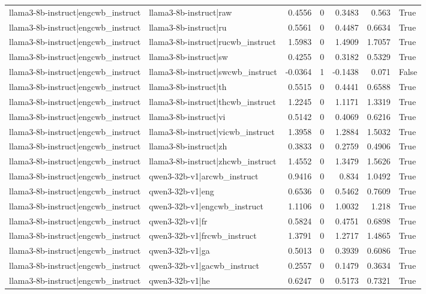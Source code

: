\begin{table}
\begin{tabular}{l l r r r r l}
llama3-8b-instruct|engcwb_instruct & llama3-8b-instruct|raw & 0.4556 & 0 & 0.3483 & 0.563 & True \\
llama3-8b-instruct|engcwb_instruct & llama3-8b-instruct|ru & 0.5561 & 0 & 0.4487 & 0.6634 & True \\
llama3-8b-instruct|engcwb_instruct & llama3-8b-instruct|rucwb_instruct & 1.5983 & 0 & 1.4909 & 1.7057 & True \\
llama3-8b-instruct|engcwb_instruct & llama3-8b-instruct|sw & 0.4255 & 0 & 0.3182 & 0.5329 & True \\
llama3-8b-instruct|engcwb_instruct & llama3-8b-instruct|swcwb_instruct & -0.0364 & 1 & -0.1438 & 0.071 & False \\
llama3-8b-instruct|engcwb_instruct & llama3-8b-instruct|th & 0.5515 & 0 & 0.4441 & 0.6588 & True \\
llama3-8b-instruct|engcwb_instruct & llama3-8b-instruct|thcwb_instruct & 1.2245 & 0 & 1.1171 & 1.3319 & True \\
llama3-8b-instruct|engcwb_instruct & llama3-8b-instruct|vi & 0.5142 & 0 & 0.4069 & 0.6216 & True \\
llama3-8b-instruct|engcwb_instruct & llama3-8b-instruct|vicwb_instruct & 1.3958 & 0 & 1.2884 & 1.5032 & True \\
llama3-8b-instruct|engcwb_instruct & llama3-8b-instruct|zh & 0.3833 & 0 & 0.2759 & 0.4906 & True \\
llama3-8b-instruct|engcwb_instruct & llama3-8b-instruct|zhcwb_instruct & 1.4552 & 0 & 1.3479 & 1.5626 & True \\
llama3-8b-instruct|engcwb_instruct & qwen3-32b-v1|arcwb_instruct & 0.9416 & 0 & 0.834 & 1.0492 & True \\
llama3-8b-instruct|engcwb_instruct & qwen3-32b-v1|eng & 0.6536 & 0 & 0.5462 & 0.7609 & True \\
llama3-8b-instruct|engcwb_instruct & qwen3-32b-v1|engcwb_instruct & 1.1106 & 0 & 1.0032 & 1.218 & True \\
llama3-8b-instruct|engcwb_instruct & qwen3-32b-v1|fr & 0.5824 & 0 & 0.4751 & 0.6898 & True \\
llama3-8b-instruct|engcwb_instruct & qwen3-32b-v1|frcwb_instruct & 1.3791 & 0 & 1.2717 & 1.4865 & True \\
llama3-8b-instruct|engcwb_instruct & qwen3-32b-v1|ga & 0.5013 & 0 & 0.3939 & 0.6086 & True \\
llama3-8b-instruct|engcwb_instruct & qwen3-32b-v1|gacwb_instruct & 0.2557 & 0 & 0.1479 & 0.3634 & True \\
llama3-8b-instruct|engcwb_instruct & qwen3-32b-v1|he & 0.6247 & 0 & 0.5173 & 0.7321 & True \\

\end{tabular}
\end{table}
